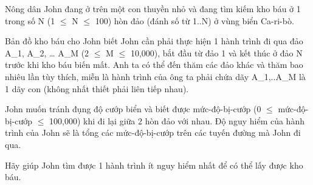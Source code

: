 Nông dân John đang ở trên một con thuyền nhỏ và đang tìm kiếm  kho báu ở 1 trong số N (1  $\le$  N  $\le$  100) hòn đảo (đánh số từ 1..N)  ở vùng biển Ca-ri-bò.  

   Bản đồ kho báu cho John biết John cần phải thực hiện 1 hành  trình đi qua đảo A\_1, A\_2, … A\_M (2  $\le$  M  $\le$  10,000), bắt đầu từ  đảo 1 và kết thúc ở đảo N trước khi kho báu biến mất. Anh ta có thể  đến thăm các đảo khác và thăm bao nhiêu lần tùy thích, miễn là hành  trình của ông ta phải chứa dãy A\_1,..A\_M là 1 dãy con (không nhất  thiết phải liên tiếp nhau).  

   John muốn tránh đụng độ cướp biển và biết được mức-độ-bị-cướp  (0  $\le$  mức-độ-bị-cướp  $\le$  100,000) khi đi lại giữa 2 hòn đảo với  nhau. Độ nguy hiểm của hành trình của John sẽ là tổng các mức-độ-bị-cướp  trên các tuyến đường mà John đi qua.  

   Hãy giúp John tìm được 1 hành trình ít nguy hiểm nhất để  có thể lấy được kho báu.